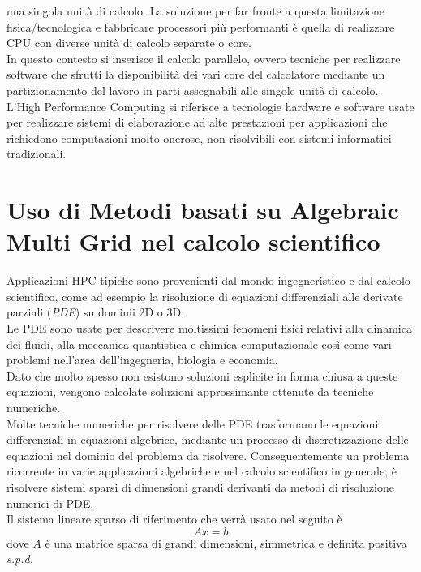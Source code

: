 una singola unità di calcolo.
\voidLine
La soluzione per far fronte a questa limitazione fisica/tecnologica e 
fabbricare processori più performanti è quella di realizzare CPU con diverse unità di calcolo separate o core.\\
In questo contesto si inserisce il calcolo parallelo, ovvero tecniche per realizzare software che 
sfrutti la disponibilità dei vari core del calcolatore mediante un partizionamento del lavoro in parti
assegnabili alle singole unità di calcolo.\\
\voidLine
L'High Performance Computing si riferisce a tecnologie hardware e software 
usate per realizzare sistemi di elaborazione ad alte prestazioni 
per applicazioni che richiedono computazioni molto onerose, non risolvibili con sistemi informatici tradizionali.\\

\section{Uso di Metodi basati su Algebraic Multi Grid nel calcolo scientifico}
Applicazioni HPC tipiche sono provenienti dal mondo ingegneristico e dal calcolo scientifico,
come ad esempio la risoluzione di equazioni differenziali alle derivate parziali (\emph{PDE}) su dominii 2D o 3D.\\
Le PDE sono usate per descrivere moltissimi fenomeni fisici relativi alla
dinamica dei fluidi, alla meccanica quantistica e chimica computazionale %
così come vari problemi nell'area dell'ingegneria, biologia e economia.\\
Dato che molto spesso non esistono soluzioni esplicite in forma chiusa a queste equazioni,
vengono calcolate soluzioni approssimante ottenute da tecniche numeriche.\\ 
Molte tecniche numeriche per risolvere delle PDE trasformano le equazioni differenziali
in equazioni algebrice, mediante un processo di discretizzazione delle equazioni nel dominio del problema da risolvere.
Conseguentemente un problema ricorrente in varie applicazioni algebriche e nel calcolo scientifico in generale, 
è risolvere sistemi sparsi di dimensioni grandi derivanti da metodi di risoluzione numerici di PDE.\\
\voidLine
Il sistema lineare sparso di riferimento che verrà usato nel seguito è 
\begin{equation} \label{eq:1}
Ax=b
\end{equation}
dove $A$ è una matrice sparsa di grandi dimensioni,
simmetrica e definita positiva \emph{s.p.d.}\\
